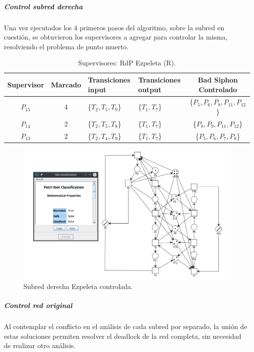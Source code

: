 \subparagraph{Control subred derecha}
\hfill \break
Una vez ejecutados los 4 primeros pasos del algoritmo, sobre la subred en cuestión, se obtuvieron los supervisores a agregar para controlar la misma, resolviendo el problema de punto muerto. \\
\bigskip

\begin{table}[H]
    \centering
    \begin{tabular}{|c|c|P{2.2cm}|P{2.2cm}|c|}
   \hline
    \textbf{Supervisor} & \textbf{Marcado} & \textbf{Transiciones input} & \textbf{Transiciones output} & \textbf{Bad Siphon Controlado}  \\  \hline
    $P_{15}$ & 4 & \{$T_{2}, T_{5}, T_{9}$\} & \{$T_{1}, T_{7}$\} & \{$P_5,P_{6},P_{8},P_{11},P_{12}$\} \\ 
    \hline
    $P_{14}$ & 2 & \{$T_{2}, T_{5}, T_{8}$\} & \{$T_{1}, T_{7}$\} & \{$P_8,P_{9},P_{11},P_{12}$\} \\ 
    \hline
    $P_{13}$ & 2 & \{$T_{2}, T_{4}, T_{9}$\} & \{$T_{1}, T_{7}$\} & 
    \{$P_5,P_{6},P_{7},P_{8}$\} \\ 
    \hline
    \end{tabular}
    \label{tab:ezpeletaderecha}
    \caption{Supervisores: RdP Ezpeleta (R).}
\end{table}

\begin{figure}[H]
	\centering
	\includegraphics[scale=0.55]{Figures/algoritmo3/ezpeleta4.png}
	\caption{Subred derecha Ezpeleta controlada.}
	\label{fig:ezpeletasubderechacontrolada}
 \end{figure}

\subparagraph{Control red original}
Al contemplar el conflicto en el análisis de cada subred por separado, la unión de estas soluciones permiten resolver el deadlock de la red completa, sin necesidad de realizar otro análisis.\\

